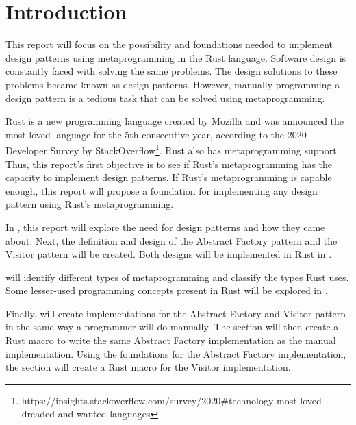 \section{Introduction}
This report will focus on the possibility and foundations needed to implement design patterns using metaprogramming in the Rust language.
Software design is constantly faced with solving the same problems.
The design solutions to these problems became known as design patterns.
However, manually programming a design pattern is a tedious task that can be solved using metaprogramming.

Rust is a new programming language created by Mozilla and was announced the most loved language for the 5th consecutive year, according to the 2020 Developer Survey by StackOverflow\footnote{https://insights.stackoverflow.com/survey/2020\#technology-most-loved-dreaded-and-wanted-languages}.
Rust also has metaprogramming support.
Thus, this report's first objective is to see if Rust's metaprogramming has the capacity to implement design patterns.
If Rust's metaprogramming is capable enough, this report will propose a foundation for implementing any design pattern using Rust's metaprogramming.

In , this report will explore the need for design patterns and how they came about.
Next, the definition and design of the Abstract Factory pattern and the Visitor pattern will be created.
Both designs will be implemented in Rust in .

 will identify different types of metaprogramming and classify the types Rust uses.
Some lesser-used programming concepts present in Rust will be explored in .

Finally,  will create implementations for the Abstract Factory and Visitor pattern in the same way a programmer will do manually.
The section will then create a Rust macro to write the same Abstract Factory implementation as the manual implementation.
Using the foundations for the Abstract Factory implementation, the section will create a Rust macro for the Visitor implementation.